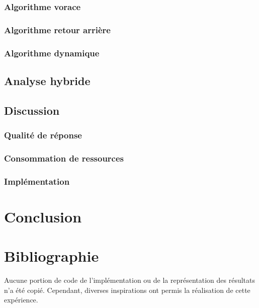 \documentclass[10pt,a4paper]{article}
\begin{document}
\subsubsection{Algorithme vorace}
\subsubsection{Algorithme retour arrière}
\subsubsection{Algorithme dynamique}

\subsection{Analyse hybride}

\subsection{Discussion}

\subsubsection{Qualité de réponse}

\subsubsection{Consommation de ressources}

\subsubsection{Implémentation}

\section{Conclusion}

\section{Bibliographie}

Aucune portion de code de l'implémentation ou de la représentation des résultats n'a été copié. Cependant, diverses inspirations ont permis la réalisation de cette expérience.
\end{document}

